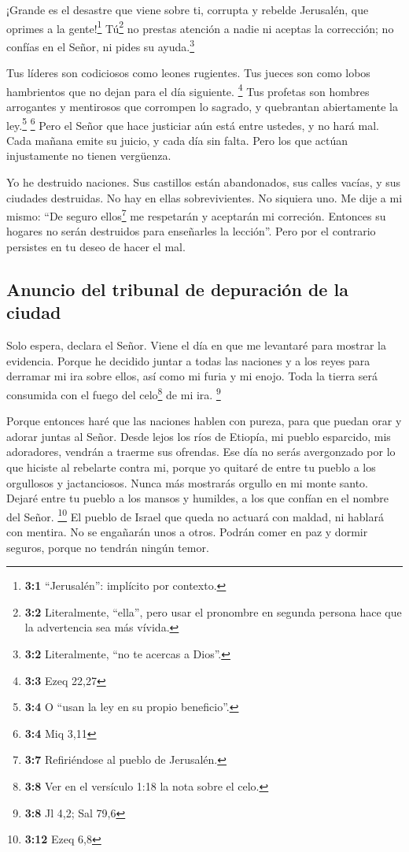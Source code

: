  ¡Grande es el desastre que viene sobre ti, corrupta y
rebelde Jerusalén, que oprimes a la gente!\footnote{\textbf{3:1}
  ``Jerusalén'': implícito por contexto.}  Tú\footnote{\textbf{3:2}
  Literalmente, ``ella'', pero usar el pronombre en segunda persona hace
  que la advertencia sea más vívida.} no prestas atención a nadie ni
aceptas la corrección; no confías en el Señor, ni pides su
ayuda.\footnote{\textbf{3:2} Literalmente, ``no te acercas a Dios''.}

 Tus líderes son codiciosos como leones rugientes. Tus
jueces son como lobos hambrientos que no dejan para el día siguiente.
\footnote{\textbf{3:3} Ezeq 22,27}  Tus profetas son
hombres arrogantes y mentirosos que corrompen lo sagrado, y quebrantan
abiertamente la ley.\footnote{\textbf{3:4} O ``usan la ley en su propio
  beneficio''.} \footnote{\textbf{3:4} Miq 3,11}  Pero el
Señor que hace justiciar aún está entre ustedes, y no hará mal. Cada
mañana emite su juicio, y cada día sin falta. Pero los que actúan
injustamente no tienen vergüenza.

 Yo he destruido naciones. Sus castillos están
abandonados, sus calles vacías, y sus ciudades destruidas. No hay en
ellas sobrevivientes. No siquiera uno.  Me dije a mi
mismo: ``De seguro ellos\footnote{\textbf{3:7} Refiriéndose al pueblo de
  Jerusalén.} me respetarán y aceptarán mi correción. Entonces su
hogares no serán destruidos para enseñarles la lección''. Pero por el
contrario persistes en tu deseo de hacer el mal.

\hypertarget{anuncio-del-tribunal-de-depuraciuxf3n-de-la-ciudad}{%
\subsection{Anuncio del tribunal de depuración de la
ciudad}\label{anuncio-del-tribunal-de-depuraciuxf3n-de-la-ciudad}}

 Solo espera, declara el Señor. Viene el día en que me
levantaré para mostrar la evidencia. Porque he decidido juntar a todas
las naciones y a los reyes para derramar mi ira sobre ellos, así como mi
furia y mi enojo. Toda la tierra será consumida con el fuego del
celo\footnote{\textbf{3:8} Ver en el versículo 1:18 la nota sobre el
  celo.} de mi ira. \footnote{\textbf{3:8} Jl 4,2; Sal 79,6}

 Porque entonces haré que las naciones hablen con pureza,
para que puedan orar y adorar juntas al Señor.  Desde
lejos los ríos de Etiopía, mi pueblo esparcido, mis adoradores, vendrán
a traerme sus ofrendas.  Ese día no serás avergonzado por
lo que hiciste al rebelarte contra mi, porque yo quitaré de entre tu
pueblo a los orgullosos y jactanciosos. Nunca más mostrarás orgullo en
mi monte santo.  Dejaré entre tu pueblo a los mansos y
humildes, a los que confían en el nombre del Señor. \footnote{\textbf{3:12}
  Ezeq 6,8}  El pueblo de Israel que queda no actuará con
maldad, ni hablará con mentira. No se engañarán unos a otros. Podrán
comer en paz y dormir seguros, porque no tendrán ningún temor.

